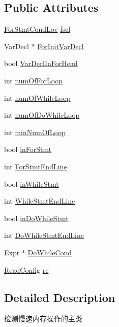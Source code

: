 \subsection*{Public Attributes}
\begin{DoxyCompactItemize}
\item 
\hyperlink{classForStmtCondLoc}{For\+Stmt\+Cond\+Loc} \hyperlink{classSlowMemoryChecker_ae82ceb324d6ca8eda59cafba44f0670e}{fscl}
\item 
Var\+Decl $\ast$ \hyperlink{classSlowMemoryChecker_a522a9d9f1e8cc77f3b60c0145b5f966b}{For\+Init\+Var\+Decl}
\item 
bool \hyperlink{classSlowMemoryChecker_afe1c220a2bf2af2ff289cd8d2034559f}{Var\+Decl\+In\+For\+Head}
\item 
int \hyperlink{classSlowMemoryChecker_a30178b54b18c14cf7f27e389885c92b1}{num\+Of\+For\+Loop}
\item 
int \hyperlink{classSlowMemoryChecker_a7ff6e854fe66a71e0f3cc2c9ee10612f}{num\+Of\+While\+Loop}
\item 
int \hyperlink{classSlowMemoryChecker_af3f2be4009f1b210d26a098b95b40494}{num\+Of\+Do\+While\+Loop}
\item 
int \hyperlink{classSlowMemoryChecker_a9152607c17f9a4200389de218a874889}{min\+Num\+Of\+Loop}
\item 
bool \hyperlink{classSlowMemoryChecker_a3eed183aed60d430815ff47d4a333eda}{in\+For\+Stmt}
\item 
int \hyperlink{classSlowMemoryChecker_a230d1bf30480bb33d1ed48e4f1e49074}{For\+Stmt\+End\+Line}
\item 
bool \hyperlink{classSlowMemoryChecker_ae644af0c0e0183c9eba51f406f7cc457}{in\+While\+Stmt}
\item 
int \hyperlink{classSlowMemoryChecker_a71abe72c12d48e7763aaff2a2af2520d}{While\+Stmt\+End\+Line}
\item 
bool \hyperlink{classSlowMemoryChecker_afb3646a2a66b2b5bb6830efec3455569}{in\+Do\+While\+Stmt}
\item 
int \hyperlink{classSlowMemoryChecker_aba744f1e41047a1df4d328fc8f683539}{Do\+While\+Stmt\+End\+Line}
\item 
Expr $\ast$ \hyperlink{classSlowMemoryChecker_a0e67ec70b12660a16935a9249cce7f26}{Do\+While\+Cond}
\item 
\hyperlink{classReadConfig}{Read\+Config} \hyperlink{classSlowMemoryChecker_a01724505f560bc3c1643881785254d67}{rc}
\end{DoxyCompactItemize}


\subsection{Detailed Description}
检测慢速内存操作的主类 

